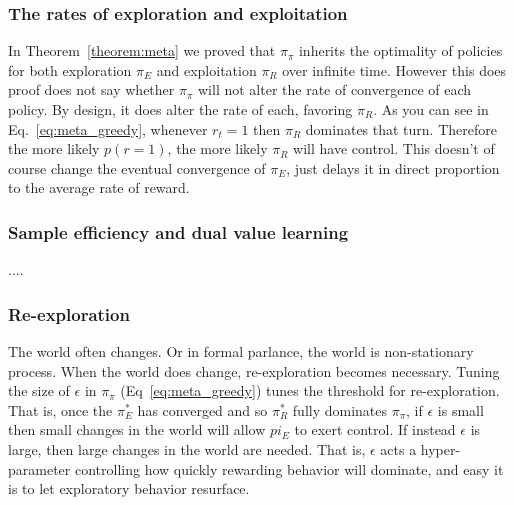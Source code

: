 \documentclass[9pt,twocolumn,twoside]{pnas-new}
\begin{document}
\subsubsection*{The rates of exploration and exploitation}
In Theorem~\ref{theorem:meta} we proved that $\pi_{\pi}$ inherits the optimality of policies for both exploration $\pi_E$ and exploitation $\pi_R$ over infinite time. However this does proof does not say whether $\pi_{\pi}$ will not alter the rate of convergence of each policy. By design, it does alter the rate of each, favoring $\pi_R$. As you can see in Eq.~\ref{eq:meta_greedy}, whenever $r_t = 1$ then $\pi_R$ dominates that turn. Therefore the more likely $p(r=1)$, the more likely $\pi_R$ will have control. This doesn't of course change the eventual convergence of $\pi_E$, just delays it in direct proportion to the average rate of reward.

\subsubsection*{Sample efficiency and dual value learning}
....


\subsubsection*{Re-exploration}
The world often changes. Or in formal parlance, the world is non-stationary process. When the world does change, re-exploration becomes necessary. Tuning the size of $\epsilon$ in $\pi_{\pi}$ (Eq~\ref{eq:meta_greedy}) tunes the threshold for re-exploration. That is, once the $\pi^*_E$ has converged and so $\pi^*_R$ fully dominates $\pi_{\pi}$, if $\epsilon$ is small then small changes in the world will allow $pi_E$ to exert control. If instead $\epsilon$ is large, then large changes in the world are needed. That is, $\epsilon$ acts a hyper-parameter controlling how quickly rewarding behavior will dominate, and easy it is to let exploratory behavior resurface.
\end{document}
